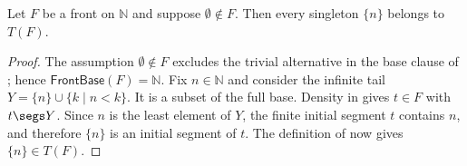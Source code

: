 \begin{lemma}
Let $F$ be a front on $\mathbb N$ and suppose $\emptyset\notin F$.  Then
every singleton $\{n\}$ belongs to $T(F)$.
\end{lemma}
\begin{proof}
The assumption $\emptyset\notin F$ excludes the trivial alternative in the
base clause of ; hence $\mathsf{FrontBase}(F)=\mathbb N$.
Fix $n\in\mathbb N$ and consider the infinite tail
$Y=\{n\}\cup\{k\mid n<k\}$.  It is a subset of the full base.  Density in
 gives $t\in F$ with $t\segs Y$.  Since $n$ is the least
element of $Y$, the finite initial segment $t$ contains $n$, and therefore
$\{n\}$ is an initial segment of $t$.  The definition of
 now gives $\{n\}\in T(F)$.
\end{proof}
